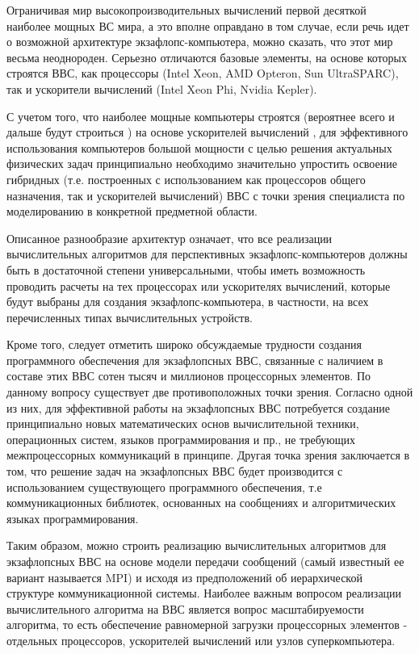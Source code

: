 Ограничивая мир высокопроизводительных вычислений первой десяткой наиболее мощных ВС мира, а это вполне оправдано в том случае, если речь идет о возможной архитектуре экзафлопс-компьютера,  можно сказать, что этот мир весьма неоднороден. Серьезно отличаются базовые элементы, на основе которых строятся ВВС, как процессоры (Intel Xeon, AMD Opteron, Sun UltraSPARC), так и ускорители вычислений (Intel Xeon Phi, Nvidia Kepler). 

С учетом того, что наиболее мощные компьютеры строятся (вероятнее всего и дальше будут строиться \cite{Lu2015}) на основе ускорителей вычислений \cite{Stepanenko2010}, для эффективного использования компьютеров большой мощности с целью решения актуальных физических задач принципиально необходимо значительно упростить освоение гибридных (т.е. построенных с использованием как процессоров общего назначения, так и ускорителей вычислений) ВВС с точки зрения специалиста по моделированию в конкретной предметной области. 

Описанное разнообразие архитектур означает, что все реализации вычислительных алгоритмов для перспективных экзафлопс-компьютеров должны быть в достаточной степени универсальными, чтобы иметь возможность проводить расчеты на тех процессорах или ускорителях вычислений, которые будут  выбраны для создания экзафлопс-компьютера, в частности, на всех перечисленных типах вычислительных устройств. 


Кроме того, следует отметить широко обсуждаемые трудности создания программного обеспечения для экзафлопсных ВВС, связанные с наличием в составе этих ВВС сотен тысяч и миллионов процессорных элементов. По данному вопросу существует две противоположных точки зрения. 
Согласно одной из них, для эффективной работы на экзафлопсных ВВС потребуется создание принципиально новых математических основ вычислительной техники, операционных систем, языков программирования и пр., не требующих межпроцессорных коммуникаций в принципе. Другая точка зрения заключается в том, что решение задач на экзафлопсных ВВС будет производится с использованием существующего программного обеспечения, т.е коммуникационных библиотек, основанных на сообщениях \cite{Gropp2009} и алгоритмических языках программирования. 

Таким образом, можно строить реализацию вычислительных алгоритмов для 
экзафлопсных ВВС на основе модели передачи сообщений (самый известный ее вариант называется MPI) и исходя из предположений об иерархической структуре коммуникационной системы.
Наиболее важным вопросом реализации вычислительного алгоритма на ВВС является вопрос масштабируемости алгоритма, то есть обеспечение равномерной загрузки процессорных элементов - отдельных процессоров, ускорителей вычислений или узлов суперкомпьютера.  

